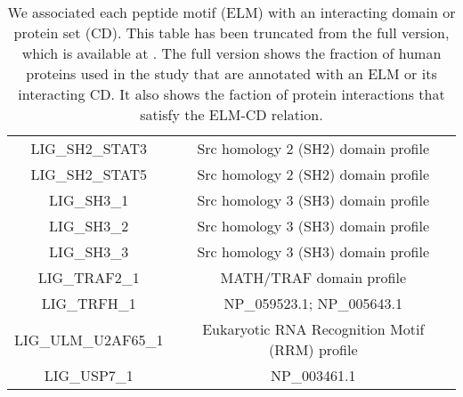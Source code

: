 \begin{table}
\begin{center}
\begin{tabular}{|c|c|}
LIG\_SH2\_STAT3 & Src homology 2 (SH2) domain profile \\
LIG\_SH2\_STAT5 & Src homology 2 (SH2) domain profile \\
LIG\_SH3\_1 & Src homology 3 (SH3) domain profile \\
LIG\_SH3\_2 & Src homology 3 (SH3) domain profile \\
LIG\_SH3\_3 & Src homology 3 (SH3) domain profile \\
LIG\_TRAF2\_1 & MATH/TRAF domain profile \\
LIG\_TRFH\_1 & NP\_059523.1; NP\_005643.1 \\
LIG\_ULM\_U2AF65\_1 & Eukaryotic RNA Recognition Motif (RRM) profile \\
LIG\_USP7\_1 & NP\_003461.1 \\
\hline
  \end{tabular}
\end{center}
\caption[Counter domain/peptide motif relations and coverage]{\small
  We associated each peptide motif (ELM) with an interacting domain or
  protein set (CD). This table has been truncated from the full
  version, which is available at
  . The
  full version shows the fraction of human proteins used in the study
  that are annotated with an ELM or its interacting CD. It also shows
  the faction of protein interactions that satisfy the ELM-CD
  relation. \label{tbl:medGenAdd2:cd_elm}}
\end{table}
